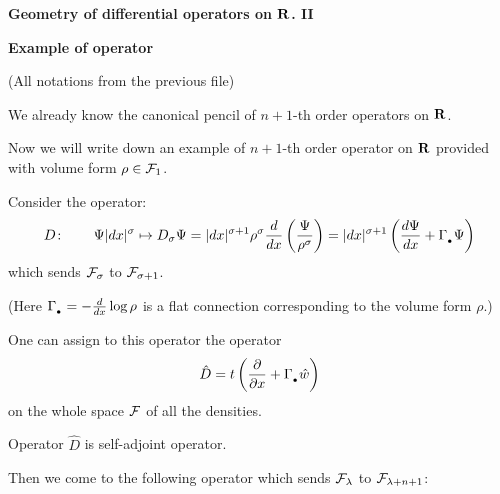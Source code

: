 \def\vare {\varepsilon}
\def\A {{\bf A}}
\def\t {\tilde}
\def\a {\alpha}
\def\K {{\bf K}}
\def\N {{\bf N}}
\def\V {{\cal V}}
\def\s {{\sigma}}
\def\S {{\Sigma}}
\def\s {{\sigma}}
\def\p{\partial}
\def\vare{{\varepsilon}}
\def\Q {{\bf Q}}
\def\D {{\cal D}}
\def\G {{\Gamma}}
\def\C {{\bf C}}
\def\M {{\cal M}}
\def\Z {{\bf Z}}
\def\U  {{\cal U}}
\def\H {{\cal H}}
\def\R  {{\bf R}}
\def\S  {{\bf S}}
\def\E  {{\bf E}}
\def\l {\lambda}
\def\degree {{\bf {\rm degree}\,\,}}
\def \finish {${\,\,\vrule height1mm depth2mm width 8pt}$}
\def \m {\medskip}
\def\p {\partial}
\def\r {{\bf r}}
\def\v {{\bf v}}
\def\n {{\bf n}}
\def\t {{\bf t}}
\def\b {{\bf b}}
\def\c {{\bf c }}
\def\e{{\bf e}}
\def\ac {{\bf a}}
\def \X   {{\bf X}}
\def \Y   {{\bf Y}}
\def \x   {{\bf x}}
\def \y   {{\bf y}}
\def \G{{\cal G}}
\def \F {{\cal F}}
\def\s {\sigma}
\def \ggb {\Gamma_{_{\bullet}}}
\def \gb {\Gamma_{_{\bullet}}}
           \centerline {\bf Geometry of differential operators on $\R$. II}


   {\bf Example of operator}

(All notations from the previous file)


We already know the canonical pencil of $n+1$-th order operators on
$\R$.

Now we will write down an example of $n+1$-th order operator on $\R$
provided with volume form $\rho\in \F_{1}$.








   Consider the operator:
              $$
              D\colon \qquad   \Psi |dx|^\s \mapsto
              D_\sigma\Psi=|dx|^{\s+1}\rho^\s{d\over dx}\left({\Psi\over \rho^\s}\right)=
              |dx|^{\s+1}\left({d\Psi\over dx}+\gb\Psi\right)
              $$
           which sends $\F_\sigma$ to $\F_{\sigma+1}$.

      (Here $\gb=-{d\over dx}\log \rho$ is a flat connection corresponding to the volume form $\rho$.)

One can assign to this operator the operator
              $$
              \hat D=t\left({\p\over \p x}+\gb\hat w\right)
              $$
on the whole space $\F$ of all the densities.

Operator $\hat D$ is self-adjoint operator.


Then we come to the following operator which sends $\F_\lambda$ to $\F_{\lambda+n+1}$:


